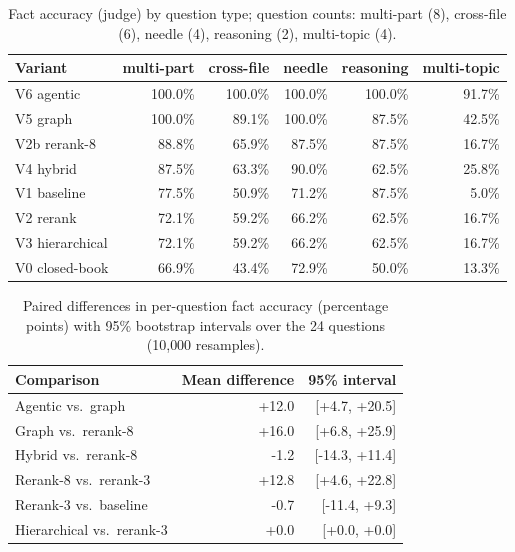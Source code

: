 \documentclass[11pt,a4paper]{article}
\begin{document}
\begin{table}[h]\centering\small
\caption{Fact accuracy (judge) by question type; question counts: multi-part (8), cross-file (6), needle (4), reasoning (2), multi-topic (4).}
\begin{tabular}{@{}lrrrrr@{}}\toprule
Variant & multi-part & cross-file & needle & reasoning & multi-topic\\\midrule
V6 agentic & 100.0\% & 100.0\% & 100.0\% & 100.0\% & 91.7\% \\
V5 graph & 100.0\% & 89.1\% & 100.0\% & 87.5\% & 42.5\% \\
V2b rerank-8 & 88.8\% & 65.9\% & 87.5\% & 87.5\% & 16.7\% \\
V4 hybrid & 87.5\% & 63.3\% & 90.0\% & 62.5\% & 25.8\% \\
V1 baseline & 77.5\% & 50.9\% & 71.2\% & 87.5\% & 5.0\% \\
V2 rerank & 72.1\% & 59.2\% & 66.2\% & 62.5\% & 16.7\% \\
V3 hierarchical & 72.1\% & 59.2\% & 66.2\% & 62.5\% & 16.7\% \\
V0 closed-book & 66.9\% & 43.4\% & 72.9\% & 50.0\% & 13.3\% \\
\bottomrule\end{tabular}
\end{table}

\begin{table}[h]\centering\small
\caption{Paired differences in per-question fact accuracy (percentage points) with 95\% bootstrap intervals over the 24 questions (10{,}000 resamples).}
\begin{tabular}{@{}lrr@{}}\toprule
Comparison & Mean difference & 95\% interval\\\midrule
Agentic vs.\ graph & +12.0 & [+4.7, +20.5] \\
Graph vs.\ rerank-8 & +16.0 & [+6.8, +25.9] \\
Hybrid vs.\ rerank-8 & -1.2 & [-14.3, +11.4] \\
Rerank-8 vs.\ rerank-3 & +12.8 & [+4.6, +22.8] \\
Rerank-3 vs.\ baseline & -0.7 & [-11.4, +9.3] \\
Hierarchical vs.\ rerank-3 & +0.0 & [+0.0, +0.0] \\
\bottomrule\end{tabular}
\end{table}
\end{document}
